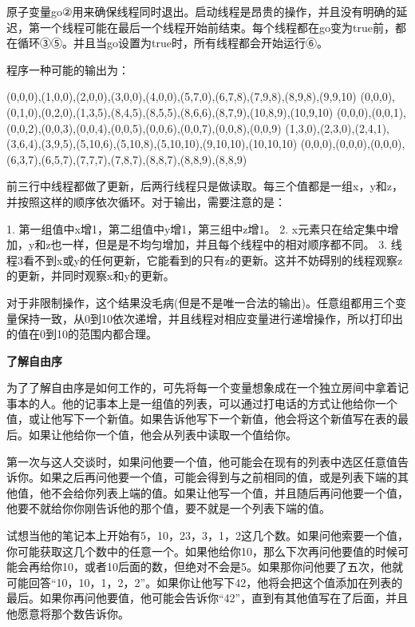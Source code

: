 原子变量go②用来确保线程同时退出。启动线程是昂贵的操作，并且没有明确的延迟，第一个线程可能在最后一个线程开始前结束。每个线程都在go变为true前，都在循环③⑤。并且当go设置为true时，所有线程都会开始运行⑥。

程序一种可能的输出为：

\begin{cpp}
(0,0,0),(1,0,0),(2,0,0),(3,0,0),(4,0,0),(5,7,0),(6,7,8),(7,9,8),(8,9,8),(9,9,10)
(0,0,0),(0,1,0),(0,2,0),(1,3,5),(8,4,5),(8,5,5),(8,6,6),(8,7,9),(10,8,9),(10,9,10)
(0,0,0),(0,0,1),(0,0,2),(0,0,3),(0,0,4),(0,0,5),(0,0,6),(0,0,7),(0,0,8),(0,0,9)
(1,3,0),(2,3,0),(2,4,1),(3,6,4),(3,9,5),(5,10,6),(5,10,8),(5,10,10),(9,10,10),(10,10,10)
(0,0,0),(0,0,0),(0,0,0),(6,3,7),(6,5,7),(7,7,7),(7,8,7),(8,8,7),(8,8,9),(8,8,9)
\end{cpp}

前三行中线程都做了更新，后两行线程只是做读取。每三个值都是一组x，y和z，并按照这样的顺序依次循环。对于输出，需要注意的是：

1. 第一组值中x增1，第二组值中y增1，第三组中z增1。
2. x元素只在给定集中增加，y和z也一样，但是是不均匀增加，并且每个线程中的相对顺序都不同。
3. 线程3看不到x或y的任何更新，它能看到的只有z的更新。这并不妨碍别的线程观察z的更新，并同时观察x和y的更新。

对于非限制操作，这个结果没毛病(但是不是唯一合法的输出)。任意组都用三个变量保持一致，从0到10依次递增，并且线程对相应变量进行递增操作，所以打印出的值在0到10的范围内都合理。

\textbf{了解自由序}

为了了解自由序是如何工作的，可先将每一个变量想象成在一个独立房间中拿着记事本的人。他的记事本上是一组值的列表，可以通过打电话的方式让他给你一个值，或让他写下一个新值。如果告诉他写下一个新值，他会将这个新值写在表的最后。如果让他给你一个值，他会从列表中读取一个值给你。

第一次与这人交谈时，如果问他要一个值，他可能会在现有的列表中选区任意值告诉你。如果之后再问他要一个值，可能会得到与之前相同的值，或是列表下端的其他值，他不会给你列表上端的值。如果让他写一个值，并且随后再问他要一个值，他要不就给你你刚告诉他的那个值，要不就是一个列表下端的值。

试想当他的笔记本上开始有5，10，23，3，1，2这几个数。如果问他索要一个值，你可能获取这几个数中的任意一个。如果他给你10，那么下次再问他要值的时候可能会再给你10，或者10后面的数，但绝对不会是5。如果那你问他要了五次，他就可能回答“10，10，1，2，2”。如果你让他写下42，他将会把这个值添加在列表的最后。如果你再问他要值，他可能会告诉你“42”，直到有其他值写在了后面，并且他愿意将那个数告诉你。

